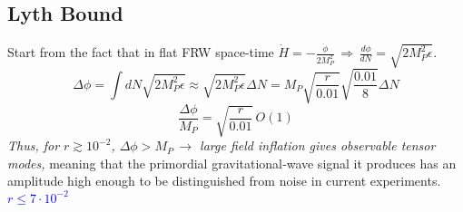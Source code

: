 \subsection{Lyth Bound}\label{sec:LythBound}
Start from the fact that in flat FRW space-time $\dot{H}=-\frac{\dot{\phi}}{2M_P^2} \, \Rightarrow \, \frac{d\phi}{dN}= \sqrt{2M_P^2\epsilon}$.
\begin{equation}
    \Delta \phi = \int dN \sqrt{2M_P^2\epsilon} \approx \sqrt{2M_P^2\epsilon}\Delta N = M_P\sqrt{\frac{r}{0.01}}\sqrt{\frac{0.01}{8}}\Delta N  
\end{equation}
\begin{equation}
    \frac{\Delta \phi}{M_P} = \sqrt{\frac{r}{0.01}}\,O(1)
\end{equation}
\emph{Thus, for $r\gtrsim 10^{-2}$, $\Delta \phi > M_P \, \rightarrow$ large field inflation gives observable tensor modes,} meaning that the primordial gravitational‐wave signal it produces has an amplitude high enough 
 to be distinguished from noise in current experiments. \textcolor{blue}{$r \leq  7 \cdot 10^{-2}$}